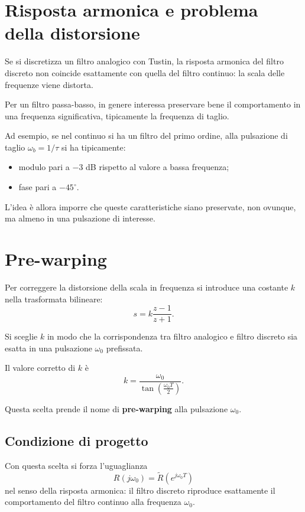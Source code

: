 \section{Risposta armonica e problema della distorsione}

Se si discretizza un filtro analogico con Tustin, la risposta armonica del filtro discreto
non coincide esattamente con quella del filtro continuo: la scala delle frequenze viene distorta.

Per un filtro passa-basso, in genere interessa preservare bene il comportamento
in una frequenza significativa, tipicamente la frequenza di taglio.

Ad esempio, se nel continuo si ha un filtro del primo ordine,
alla pulsazione di taglio \(\omega_b=1/\tau\) si ha tipicamente:
\begin{itemize}
    \item modulo pari a \(-3\) dB rispetto al valore a bassa frequenza;
    \item fase pari a \(-45^\circ\).
\end{itemize}

L'idea è allora imporre che queste caratteristiche siano preservate,
non ovunque, ma almeno in una pulsazione di interesse.

\section{Pre-warping}

Per correggere la distorsione della scala in frequenza si introduce una costante \(k\)
nella trasformata bilineare:
\[
s=k\frac{z-1}{z+1}.
\]

Si sceglie \(k\) in modo che la corrispondenza tra filtro analogico e filtro discreto
sia esatta in una pulsazione \(\omega_0\) prefissata.

Il valore corretto di \(k\) è
\[
k=\frac{\omega_0}{\tan\!\left(\frac{\omega_0 T}{2}\right)}.
\]

Questa scelta prende il nome di \textbf{pre-warping} alla pulsazione \(\omega_0\).

\subsection*{Condizione di progetto}

Con questa scelta si forza l'uguaglianza
\[
R(j\omega_0)=\tilde R(e^{j\omega_0 T})
\]
nel senso della risposta armonica: il filtro discreto riproduce esattamente
il comportamento del filtro continuo alla frequenza \(\omega_0\).

